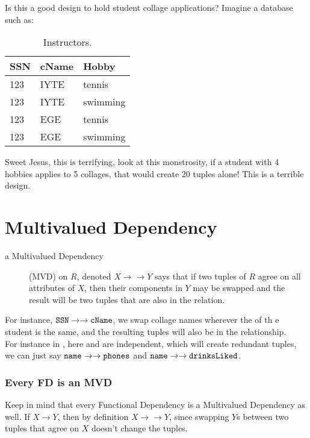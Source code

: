 \documentclass[11pt,a4paper,twocolumn]{book}
\begin{document}
Is this a good design to hold student collage applications? Imagine a database such as:
\begin{table}[h]
    \begin{tabular}{lll}
		SSN & cName & Hobby\\
        \toprule
        123 & IYTE & tennis\\
        123 & IYTE & swimming\\
        123 & EGE & tennis\\
        123 & EGE & swimming\\
        \bottomrule
    \end{tabular}
    \caption{Instructors.}
    \label{tab:inst}
\end{table}

Sweet Jesus, this is terrifying, look at this monstrosity, if a student with 4 hobbies applies to 5 collages, that would create 20 tuples alone! This is a terrible design.

\section{Multivalued Dependency}

\begin{description}
\item[a Multivalued Dependency] (MVD) on $R$, denoted $X \to \to Y$ says that if two tuples of $R$ agree on all attributes of $X$, then their components in $Y$ may be swapped and the result will be two tuples that are also in the relation.
\end{description}

\newcommand{\mvn}{\ensuremath{\to\to}}
For instance, $\C{SSN} \mvn \C{cName}$, we swap collage names wherever the  of th e student is the same, and the resulting tuples will also be in the relationship.\\

For instance in , here  and  are independent, which will create redundant tuples, we can just say $\C{name} \mvn \C{phones}$ and $\C {name} \mvn \C{drinksLiked}$.

\subsubsection{Every FD is an MVD}

Keep in mind that every Functional Dependency is a Multivalued Dependency as well. If $X \to Y$, then by definition $X \mvn Y$, since swapping $Y$s between two tuples that agree on $X$ doesn't change the tuples.
\end{document}
